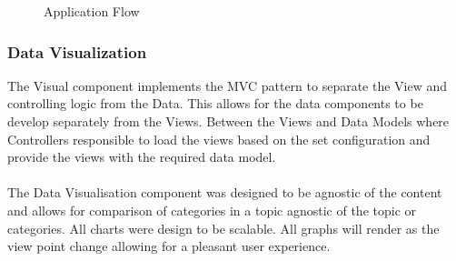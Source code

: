 \documentclass[12pt]{article} %
\begin{document}
		\begin{figure}[H] %
			\caption{Application Flow}
			\label{fig:speciation}
		\end{figure}
	
	\subsubsection{Data Visualization}
	
	The Visual component implements the MVC pattern to separate the View and controlling logic from the Data. This allows for the data components to be develop separately from the Views. Between the Views and Data Models where Controllers responsible to load the views based on the set configuration and provide the views with the required data model.\\
	\\
	The Data Visualisation component was designed to be agnostic of the content and allows for comparison of categories in a topic agnostic of the topic or categories.
	All charts were design to be scalable. All graphs will render as the view point change allowing for a pleasant user experience.
	
\end{document}
